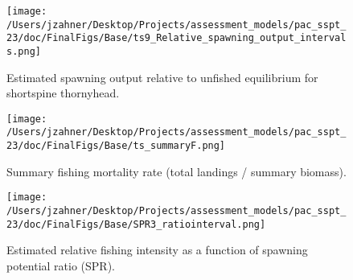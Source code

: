 \documentclass[11pt,
  letterpaper,
]{article}
\begin{document}
\begin{figure}
{\centering
\texttt{[image: /Users/jzahner/Desktop/Projects/assessment\_models/pac\_sspt\_23/doc/FinalFigs/Base/ts9\_Relative\_spawning\_output\_intervals.png]}
}
\caption{Estimated spawning output relative to unfished equilibrium for shortspine thornyhead.\label{fig:rel_ssb_trajectoryES}}
\end{figure}

\begin{figure}
{\centering
\texttt{[image: /Users/jzahner/Desktop/Projects/assessment\_models/pac\_sspt\_23/doc/FinalFigs/Base/ts\_summaryF.png]}
}
\caption{Summary fishing mortality rate (total landings / summary biomass).\label{fig:summary_fES}}
\end{figure}

\begin{figure}
{\centering
\texttt{[image: /Users/jzahner/Desktop/Projects/assessment\_models/pac\_sspt\_23/doc/FinalFigs/Base/SPR3\_ratiointerval.png]}
}
\caption{Estimated relative fishing intensity as a function of spawning potential ratio (SPR).\label{fig:spr_trajectoryES}}
\end{figure}
\end{document}
